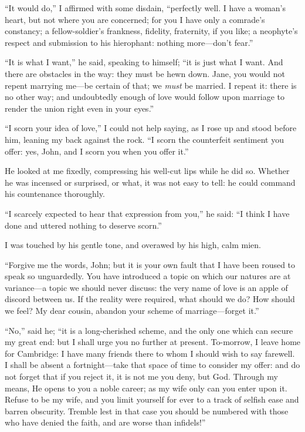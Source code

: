 \enquote{It would do,} I affirmed with some disdain, \enquote{perfectly
	well. I have a woman's heart, but not where you are concerned; for you
	I have only a comrade's constancy; a fellow-soldier's frankness,
	fidelity, fraternity, if you like; a neophyte's respect and submission
	to his hierophant: nothing more---don't fear.}

\enquote{It is what I want,} he said, speaking to himself; \enquote{it is just
	what I want. And there are obstacles in the way: they must be hewn
	down. Jane, you would not repent marrying me---be certain of that; we
	\emph{must} be married. I repeat it: there is no other way; and
	undoubtedly enough of love would follow upon marriage to render the
	union right even in your eyes.}

\enquote{I scorn your idea of love,} I could not help saying, as I rose
up and stood before him, leaning my back against the rock. \enquote{I
	scorn the counterfeit sentiment you offer: yes, \St{} John, and I scorn
	you when you offer it.}

He looked at me fixedly, compressing his well-cut lips while he did so.
Whether he was incensed or surprised, or what, it was not easy to tell:
he could command his countenance thoroughly.

\enquote{I scarcely expected to hear that expression from you,} he said:
\enquote{I think I have done and uttered nothing to deserve scorn.}

I was touched by his gentle tone, and overawed by his high, calm mien.

\enquote{Forgive me the words, \St{} John; but it is your own fault that I
	have been roused to speak so unguardedly. You have introduced a topic
	on which our natures are at variance---a topic we should never discuss:
	the very name of love is an apple of discord between us. If the reality
	were required, what should we do? How should we feel? My dear cousin,
	abandon your scheme of marriage---forget it.}

\enquote{No,} said he; \enquote{it is a long-cherished scheme, and the
	only one which can secure my great end: but I shall urge you no further
	at present. To-morrow, I leave home for Cambridge: I have many friends
	there to whom I should wish to say farewell. I shall be absent a
	fortnight---take that space of time to consider my offer: and do not
	forget that if you reject it, it is not me you deny, but God. Through
	my means, He opens to you a noble career; as my wife only can you enter
	upon it. Refuse to be my wife, and you limit yourself for ever to a
	track of selfish ease and barren obscurity. Tremble lest in that case
	you should be numbered with those who have denied the faith, and are
	worse than infidels!}

